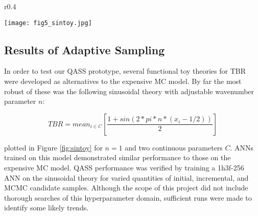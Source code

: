 \begin{wrapfigure}{r}{0.4\textwidth}
  \vspace{-60pt}
  \begin{center}
    \texttt{[image: fig5\_sintoy.jpg]}
	\caption{Sinusoidal toy TBR model with two continuous parameters, wavenumber 1}
    \label{fig:sintoy}
  \end{center}
  \vspace{-30pt}
\end{wrapfigure}

\subsection{Results of Adaptive Sampling}
\label{sec:adaptiveres}

In order to test our QASS prototype, several functional toy theories for TBR were developed as alternatives to the expensive MC model. By far the most robust of these was the following sinusoidal theory with adjustable wavenumber parameter $n$:

\begin{equation}
    TBR = mean_{i \in C} \left[ \frac{1 + sin(2*pi*n*(x_i - 1/2)) }{2} \right]
\end{equation}

plotted in Figure \ref{fig:sintoy} for $n=1$ and two continuous parameters $C$. ANNs trained on this model demonstrated similar performance to those on the expensive MC model. QASS performance was verified by training a 1h3f-256 ANN on the sinusoidal theory for varied quantities of initial, incremental, and MCMC candidate samples. Although the scope of this project did not include thorough searches of this hyperparameter domain, sufficient runs were made to identify some likely trends.

